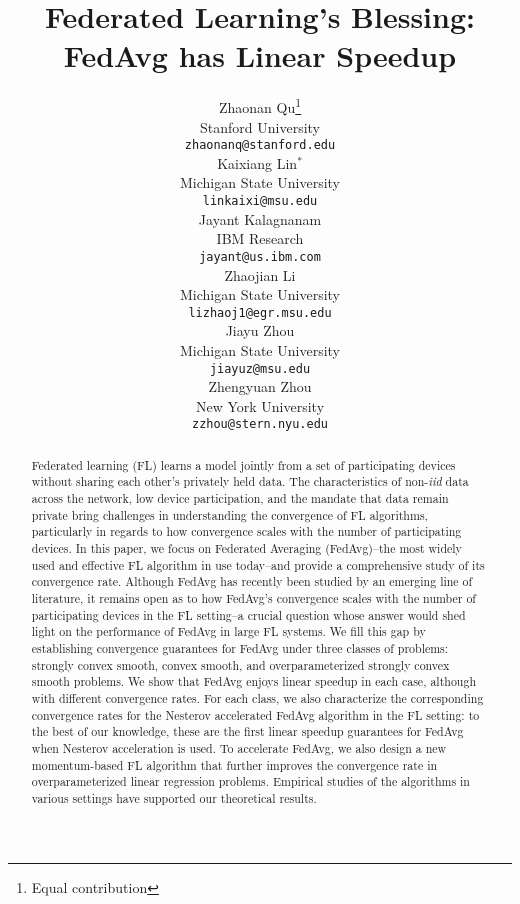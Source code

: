 \documentclass{article}
\title{Federated Learning's Blessing:\\
FedAvg has Linear Speedup}
\author{%
  Zhaonan Qu\thanks{Equal contribution} \\
 Stanford University\\
  \texttt{zhaonanq@stanford.edu} \\
  \And
  Kaixiang Lin$^*$ \\
  Michigan State University \\
  \texttt{linkaixi@msu.edu} \\
  \AND
  Jayant Kalagnanam \\
  IBM Research \\
  \texttt{jayant@us.ibm.com} \\
  \And
  Zhaojian Li \\
  Michigan State University \\
  \texttt{lizhaoj1@egr.msu.edu} \\
  \And
  Jiayu Zhou\\
  Michigan State University \\
  \texttt{jiayuz@msu.edu} \\
  \And
  Zhengyuan Zhou\\
  New York University \\
  \texttt{zzhou@stern.nyu.edu} \\
}
\begin{document}
\maketitle

\begin{abstract}
Federated learning (FL) learns a model jointly from a set of participating devices without sharing each other's privately held data. The characteristics of non-\textit{iid} data across the network, low device participation, and the mandate that data remain private bring challenges in understanding the convergence of FL algorithms, particularly in regards to how convergence scales with the number of participating devices. In this paper, we focus on Federated Averaging (FedAvg)--the most widely used and effective FL algorithm in use today--and provide a comprehensive study of its convergence rate. Although FedAvg has recently been studied by an emerging line of literature, it remains open as to how FedAvg's convergence scales with the number of participating devices in the FL setting--a crucial question whose answer would shed light on the performance of FedAvg in large FL systems. We fill this gap by establishing convergence guarantees for FedAvg under three classes of problems: strongly convex smooth, convex smooth, and overparameterized strongly convex smooth problems. We show that FedAvg enjoys linear speedup in each case, although with different convergence rates. For each class, we also characterize the corresponding convergence rates for the Nesterov accelerated FedAvg algorithm in the FL setting: to the best of our knowledge, these are the first linear speedup guarantees for FedAvg when Nesterov acceleration is used. To accelerate FedAvg, we also design a new momentum-based FL algorithm that further improves the convergence rate in overparameterized linear regression problems. Empirical studies of the algorithms in various settings have supported our theoretical results.
\end{abstract}


%









% 
\newpage



\newpage
\appendix

\end{document}
